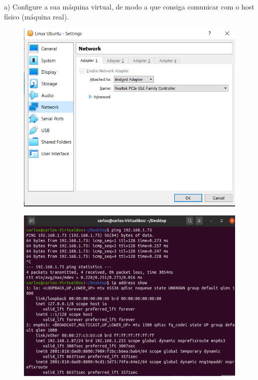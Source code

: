 \documentclass{article}
\begin{document}
	
	a) Configure a sua máquina virtual, de modo a que consiga comunicar com o host
	físico (máquina real).
	\vspace{2 em}
	\begin{figure}[!htb]
		\centering
		\includegraphics[scale=0.7]{tp_sosd_a1}
	\end{figure}
	
	\newpage 
	\begin{figure}[!htb]
		\centering
		\includegraphics[scale=0.6]{tp_sosd_a2.1}
	\end{figure}

	\vspace{2 em}
\end{document}
